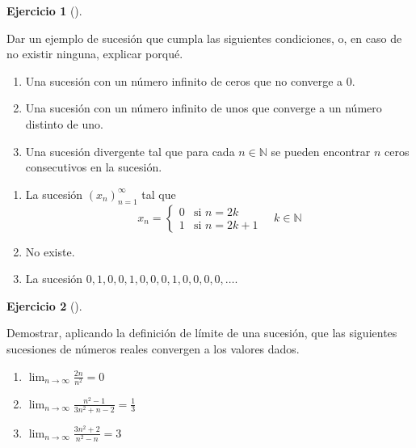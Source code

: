 \documentclass[
  a4paper,
]{scrreport}
\providecommand{\tightlist}{%
  \setlength{\itemsep}{0pt}\setlength{\parskip}{0pt}}\usepackage{longtable,booktabs,array}
\theoremstyle{definition}
\newtheorem{exercise}{Ejercicio}[chapter]
\theoremstyle{remark}
\begin{document}
\leavevmode{}%
\begin{exercise}[]\label{exr-ejemplo-sucesiones-1}

Dar un ejemplo de sucesión que cumpla las siguientes condiciones, o, en
caso de no existir ninguna, explicar porqué.

\begin{enumerate}
\def\labelenumi{\alph{enumi}.}
\tightlist
\item
  Una sucesión con un número infinito de ceros que no converge a 0.
\item
  Una sucesión con un número infinito de unos que converge a un número
  distinto de uno.
\item
  Una sucesión divergente tal que para cada \(n\in\mathbb{N}\) se pueden
  encontrar \(n\) ceros consecutivos en la sucesión.
\end{enumerate}

\end{exercise}

\begin{tcolorbox}[enhanced jigsaw, coltitle=black, left=2mm, opacityback=0, colback=white, opacitybacktitle=0.6, breakable, colbacktitle=quarto-callout-tip-color!10!white, leftrule=.75mm, toptitle=1mm, arc=.35mm, bottomtitle=1mm, rightrule=.15mm, titlerule=0mm, title=\textcolor{quarto-callout-tip-color}{\faLightbulb}\hspace{0.5em}{Solución}, colframe=quarto-callout-tip-color-frame, toprule=.15mm, bottomrule=.15mm]

\begin{enumerate}
\def\labelenumi{\alph{enumi}.}
\tightlist
\item
  La sucesión \((x_n)_{n=1}^\infty\) tal que \[x_n=\begin{cases}
  0 & \mbox{si } n=2k\\ 
  1 & \mbox{si } n=2k+1
  \end{cases}
  \quad k\in\mathbb{N}
  \]
\item
  No existe.
\item
  La sucesión \(0, 1, 0, 0, 1, 0, 0, 0, 1, 0, 0, 0, 0, \ldots\).
\end{enumerate}

\end{tcolorbox}

\leavevmode{}%
\begin{exercise}[]\label{exr-limites-sucesiones}

Demostrar, aplicando la definición de límite de una sucesión, que las
siguientes sucesiones de números reales convergen a los valores dados.

\begin{enumerate}
\def\labelenumi{\alph{enumi}.}
\item
  \(\lim_{n\to\infty}\frac{2n}{n^2}=0\)
\item
  \(\lim_{n\to\infty}\frac{n^2-1}{3n^2+n-2}=\frac{1}{3}\)
\item
  \(\lim_{n\to\infty}\frac{3n^2+2}{n^2-n}=3\)
\end{enumerate}

\end{exercise}
\end{document}
